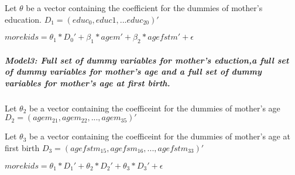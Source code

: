 \documentclass[11pt]{article}
\begin{document}
Let \(\theta\) be a vector containing the coefficient for the dummies of
mother's education. \(D_1= (educ_0,educ1,...educ_{20})'\)

\(morekids = \theta_1*D_0' + \beta_1*agem' + \beta_2*agefstm' + \epsilon\)

\subparagraph{Model3: Full set of dummy variables for mother's
eduction,a full set of dummy variables for mother's age and a full set
of dummy variables for mother's age at first
birth.}\label{model3-full-set-of-dummy-variables-for-mothers-eductiona-full-set-of-dummy-variables-for-mothers-age-and-a-full-set-of-dummy-variables-for-mothers-age-at-first-birth.}

Let \(\theta_2\) be a vector containing the coefficeint for the dummies
of mother's age \(D_2 = (agem_{21}, agem_{22},...,agem_{35})'\)

Let \(\theta_3\) be a vector containing the coefficeint for the dummies
of mother's age at first birth
\(D_3 = (agefstm_{15}, agefsm_{16},...,agefstm_{33})'\)

\(morekids = \theta_1*D_1' + \theta_2*D_2' + \theta_3*D_3' + \epsilon\)
\end{document}
